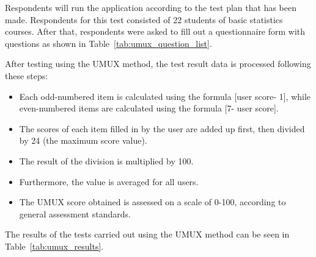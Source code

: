 \documentclass[conference,a4paper]{IEEEtran}
\begin{document}
\begin{enumerate}[label=\alph*.]
        \begin{table}[htbp]
          \caption{UMUX QUESTION LIST \cite{b12}}
          \label{tab:umux_question_list}
        \end{table}
\end{enumerate}

Respondents will run the application according to the test plan that has been made. Respondents for this test consisted of 22 students of basic statistics courses. After that, respondents were asked to fill out a questionnaire form with questions as shown in Table~\ref{tab:umux_question_list}.

After testing using the UMUX method, the test result data is processed following these steps:
\begin{itemize}
  \item Each odd-numbered item is calculated using the formula [user score- 1], while even-numbered items are calculated using the formula [7- user score].
  \item The scores of each item filled in by the user are added up first, then divided by 24 (the maximum score value).
  \item The result of the division is multiplied by 100.
  \item Furthermore, the value is averaged for all users.
  \item The UMUX score obtained is assessed on a scale of 0-100, according to general assessment standards.
\end{itemize}

The results of the tests carried out using the UMUX method can be seen in Table~\ref{tab:umux_results}.
\end{document}
